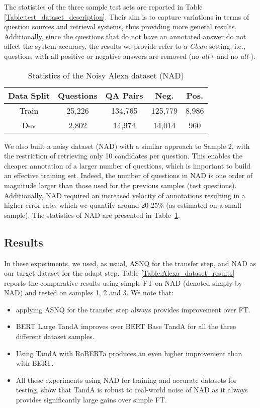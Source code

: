 \documentclass[letterpaper]{article} \usepackage{aaai20}  \usepackage{times}  \usepackage{helvet} \usepackage{courier}  \usepackage[hyphens]{url}  \usepackage{graphicx} \urlstyle{rm} \def\UrlFont{\rm}  \usepackage{graphicx}  \usepackage{todonotes}
\newcommand{\TANDA}{T{\sc and}A}
\begin{document}
The statistics of the three sample test sets are reported in Table \ref{Table:test_dataset_description}.
Their aim is to capture variations in terms of question sources and retrieval systems, thus providing more general results. Additionally, since the questions that do not have an annotated answer do not affect the system accuracy, the results we provide refer to a \emph{Clean} setting, i.e., questions with all positive or negative answers are removed (no \emph{\mbox{all+}} and no \emph{\mbox{all-}}).



\begin{table}[h]
 \small
 \center
 \vspace{.5em}
\begin{tabular}{|c|c|c|c|c|}
\hline
Data Split & Questions & QA Pairs & Neg. & Pos. \\ \hline
Train      & 25,226     & 134,765  & 125,779      & 8,986       \\ \hline
Dev        & 2,802      & 14,974   & 14,014       & 960         \\ \hline
\end{tabular}
\caption{Statistics of the Noisy Alexa dataset (NAD)}
\label{Table:Alexa_description}
\end{table}

We also built a noisy dataset (NAD) with a similar approach to Sample 2, with the restriction of retrieving only 10 candidates per question. This enables the cheaper annotation of a larger number of questions, which is important to build an effective  training set. Indeed, the number of questions in NAD is one order of magnitude larger than those used for the previous samples (test questions). Additionally, NAD required an increased velocity of annotations resulting in a higher error rate, which we quantify around 20-25\% (as estimated on a small sample). The  statistics of NAD are presented in Table~\ref{Table:Alexa_description}. 


\subsection{Results}
In these experiments, we used, as usual, ASNQ for the transfer step, and NAD as our target dataset for the adapt step.  Table \ref{Table:Alexa_dataset_results} reports the comparative results using simple FT on NAD (denoted simply by NAD) and tested on samples 1, 2 and 3. We note that:
\begin{itemize}
\item applying ASNQ for the transfer step always provides improvement over FT.
\item BERT Large {\TANDA} improves over BERT Base {\TANDA}  for all the three different dataset samples.
\item Using {\TANDA}  with RoBERTa produces an even higher improvement than with BERT. 
\item All these experiments using NAD for training and accurate datasets for testing, show that  {\TANDA} is robust to real-world noise of NAD as it always provides significantly large gains over simple FT. 
\end{itemize}
 
\end{document}

